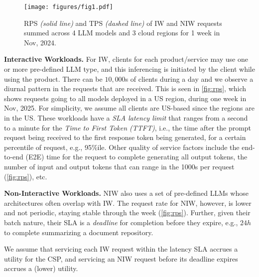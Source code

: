 \begin{figure}[t]
    \centering
\texttt{[image: figures/fig1.pdf]}
    \caption{RPS \textit{(solid line)} and TPS \textit{(dashed line)} of IW and NIW requests summed across 4 LLM models and 3 cloud regions for 1 week in Nov, 2024. 
    }
    \label{fig:rps}
    \label{fig:tps}
\end{figure}

\textbf{Interactive Workloads. }For IW, clients for each product/service 
may use one or more pre-defined LLM type, and this inferencing is initiated by the client while using the product. There can be $10,000$s of clients during a day and we observe a diurnal pattern in the requests that are received. This is seen in \autoref{fig:rps}, which shows requests going to all models deployed in a US region, during one week in Nov, 2025. For simplicity, we assume all clients are US-based since the regions are in the US.
These workloads have a \textit{SLA latency limit} that ranges from a second to a minute for the \textit{Time to First Token (TTFT)}, i.e., the time after the prompt request being received to the first response token being generated, for a certain percentile of request, e.g., 95\%ile. Other quality of service factors include the end-to-end (E2E) time for the request to complete generating all output tokens, the number of input and output tokens that can range in the 1000s per request (\autoref{fig:rps}), etc. 

\textbf{Non-Interactive Workloads. }NIW also uses a set of pre-defined LLMs whose architectures often overlap with IW.
The request rate for NIW, however, is lower and not periodic, staying stable through the week (\autoref{fig:rps}). 
Further, given their batch nature, their SLA is a \textit{deadline} for completion before they expire, e.g., $24h$ to complete summarizing a document repository.

We assume that servicing each IW request within the latency SLA accrues a utility for the CSP, and servicing an NIW request before its deadline expires accrues a (lower) utility.

